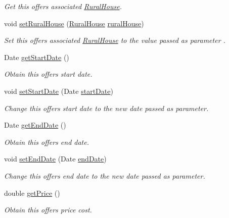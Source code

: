 \begin{DoxyCompactItemize}
\begin{DoxyCompactList}\small\item\em Get this offers associated \mbox{\hyperlink{a00188}{Rural\+House}}. \end{DoxyCompactList}\item 
void \mbox{\hyperlink{a00184_ab10c2d200d23aff2383f720b1dcecd02}{set\+Rural\+House}} (\mbox{\hyperlink{a00188}{Rural\+House}} \mbox{\hyperlink{a00184_a87036858904c59c964d2c75137a97323}{rural\+House}})
\begin{DoxyCompactList}\small\item\em Set this offers associated \mbox{\hyperlink{a00188}{Rural\+House}} to the value passed as parameter . \end{DoxyCompactList}\item 
Date \mbox{\hyperlink{a00184_a41039d86fd455568f6623996b639b7a5}{get\+Start\+Date}} ()
\begin{DoxyCompactList}\small\item\em Obtain this offers start date. \end{DoxyCompactList}\item 
void \mbox{\hyperlink{a00184_ad829c57ed6d018c673d4fff942757ed4}{set\+Start\+Date}} (Date \mbox{\hyperlink{a00184_a3c4e8f6eb72413f6f76b1e4b05404ea8}{start\+Date}})
\begin{DoxyCompactList}\small\item\em Change this offers start date to the new date passed as parameter. \end{DoxyCompactList}\item 
Date \mbox{\hyperlink{a00184_aa6adb6e4f0999247d9426233f62b2185}{get\+End\+Date}} ()
\begin{DoxyCompactList}\small\item\em Obtain this offers end date. \end{DoxyCompactList}\item 
void \mbox{\hyperlink{a00184_a4ee5091e976e14c9b34817e1c8225e01}{set\+End\+Date}} (Date \mbox{\hyperlink{a00184_a315f9b97f02da79a97fa489db212b5ce}{end\+Date}})
\begin{DoxyCompactList}\small\item\em Change this offers end date to the new date passed as parameter. \end{DoxyCompactList}\item 
double \mbox{\hyperlink{a00184_a498e3f0617a7a097d68857ce20e6addd}{get\+Price}} ()
\begin{DoxyCompactList}\small\item\em Obtain this offers price cost. \end{DoxyCompactList}\item 

\end{DoxyCompactItemize}

